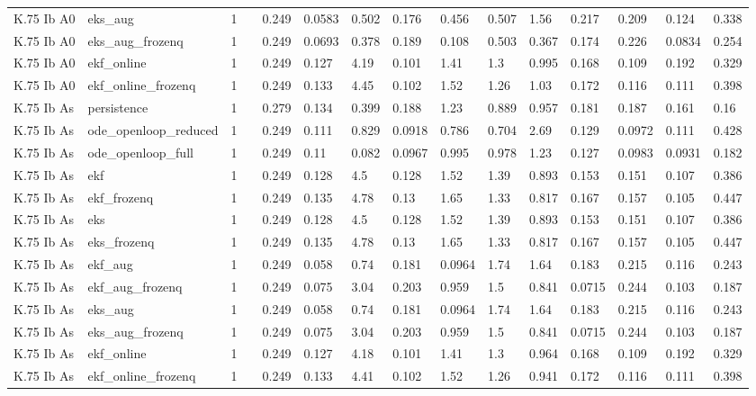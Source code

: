 \begin{table}[t]
\begin{tabular}{lllllllllllllll}
K.75 Ib A0 & eks\_aug & 1 &  & 0.249 & 0.0583 & 0.502 & 0.176 & 0.456 & 0.507 & 1.56 & 0.217 & 0.209 & 0.124 & 0.338 \\
K.75 Ib A0 & eks\_aug\_frozenq & 1 &  & 0.249 & 0.0693 & 0.378 & 0.189 & 0.108 & 0.503 & 0.367 & 0.174 & 0.226 & 0.0834 & 0.254 \\
K.75 Ib A0 & ekf\_online & 1 &  & 0.249 & 0.127 & 4.19 & 0.101 & 1.41 & 1.3 & 0.995 & 0.168 & 0.109 & 0.192 & 0.329 \\
K.75 Ib A0 & ekf\_online\_frozenq & 1 &  & 0.249 & 0.133 & 4.45 & 0.102 & 1.52 & 1.26 & 1.03 & 0.172 & 0.116 & 0.111 & 0.398 \\
K.75 Ib As & persistence & 1 &  & 0.279 & 0.134 & 0.399 & 0.188 & 1.23 & 0.889 & 0.957 & 0.181 & 0.187 & 0.161 & 0.16 \\
K.75 Ib As & ode\_openloop\_reduced & 1 &  & 0.249 & 0.111 & 0.829 & 0.0918 & 0.786 & 0.704 & 2.69 & 0.129 & 0.0972 & 0.111 & 0.428 \\
K.75 Ib As & ode\_openloop\_full & 1 &  & 0.249 & 0.11 & 0.082 & 0.0967 & 0.995 & 0.978 & 1.23 & 0.127 & 0.0983 & 0.0931 & 0.182 \\
K.75 Ib As & ekf & 1 &  & 0.249 & 0.128 & 4.5 & 0.128 & 1.52 & 1.39 & 0.893 & 0.153 & 0.151 & 0.107 & 0.386 \\
K.75 Ib As & ekf\_frozenq & 1 &  & 0.249 & 0.135 & 4.78 & 0.13 & 1.65 & 1.33 & 0.817 & 0.167 & 0.157 & 0.105 & 0.447 \\
K.75 Ib As & eks & 1 &  & 0.249 & 0.128 & 4.5 & 0.128 & 1.52 & 1.39 & 0.893 & 0.153 & 0.151 & 0.107 & 0.386 \\
K.75 Ib As & eks\_frozenq & 1 &  & 0.249 & 0.135 & 4.78 & 0.13 & 1.65 & 1.33 & 0.817 & 0.167 & 0.157 & 0.105 & 0.447 \\
K.75 Ib As & ekf\_aug & 1 &  & 0.249 & 0.058 & 0.74 & 0.181 & 0.0964 & 1.74 & 1.64 & 0.183 & 0.215 & 0.116 & 0.243 \\
K.75 Ib As & ekf\_aug\_frozenq & 1 &  & 0.249 & 0.075 & 3.04 & 0.203 & 0.959 & 1.5 & 0.841 & 0.0715 & 0.244 & 0.103 & 0.187 \\
K.75 Ib As & eks\_aug & 1 &  & 0.249 & 0.058 & 0.74 & 0.181 & 0.0964 & 1.74 & 1.64 & 0.183 & 0.215 & 0.116 & 0.243 \\
K.75 Ib As & eks\_aug\_frozenq & 1 &  & 0.249 & 0.075 & 3.04 & 0.203 & 0.959 & 1.5 & 0.841 & 0.0715 & 0.244 & 0.103 & 0.187 \\
K.75 Ib As & ekf\_online & 1 &  & 0.249 & 0.127 & 4.18 & 0.101 & 1.41 & 1.3 & 0.964 & 0.168 & 0.109 & 0.192 & 0.329 \\
K.75 Ib As & ekf\_online\_frozenq & 1 &  & 0.249 & 0.133 & 4.41 & 0.102 & 1.52 & 1.26 & 0.941 & 0.172 & 0.116 & 0.111 & 0.398 \\

\end{tabular}
\end{table}
